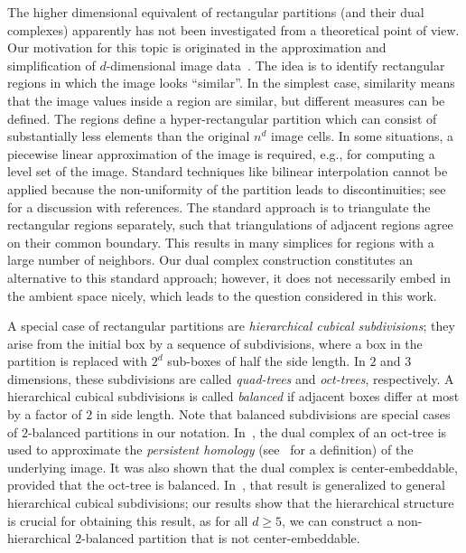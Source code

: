 \documentclass[12pt]{article}
\begin{document}
The higher dimensional equivalent of rectangular partitions (and their dual complexes) apparently has not been investigated 
from a theoretical point of view.
Our motivation for this topic is originated in the approximation and simplification of $d$-dimensional image data~\cite{bek-computing}. 
The idea is to identify rectangular regions in which the image looks ``similar''. In the simplest case, similarity means that the
image values inside a region are similar, but different measures can be defined. The regions define a hyper-rectangular partition
which can consist of substantially less elements than the original $n^d$ image cells. 
In some situations, a piecewise linear approximation of the image is required, e.g., for computing a level set of the image.
Standard techniques like bilinear interpolation cannot be applied because the non-uniformity of the partition leads to discontinuities;
see~\cite{wf-diamond} for a discussion with references.
The standard approach is to triangulate
the rectangular regions separately, such that triangulations of adjacent regions agree on their common boundary.
This results in many simplices for regions with a large number of neighbors.
Our dual complex construction constitutes an alternative to this standard approach; however,
it does not necessarily embed in the ambient space nicely, which leads to the question considered in this work.

A special case of rectangular partitions are \emph{hierarchical cubical subdivisions};
they arise from the initial box by a sequence of subdivisions, where a box in the partition is replaced
with $2^d$ sub-boxes of half the side length. In $2$ and $3$ dimensions, these subdivisions are called \emph{quad-trees}
and \emph{oct-trees}, respectively. A hierarchical cubical subdivisions is called \emph{balanced}
if adjacent boxes differ at most by a factor of $2$ in side length.
Note that balanced subdivisions are special cases of $2$-balanced partitions in our notation.
In~\cite{bek-computing},  the dual complex of an oct-tree is used to approximate the \emph{persistent homology} 
(see~\cite{eh-computational} for a definition) of the underlying image. 
It was also shown that the dual complex is center-embeddable, provided that the oct-tree is balanced.
In~\cite{ek-freudenthal}, that result is generalized to general hierarchical cubical subdivisions;
our results show that the hierarchical structure is crucial for obtaining this result,
as for all $d\geq 5$, we can construct a non-hierarchical $2$-balanced partition that is not center-embeddable.
\end{document}
